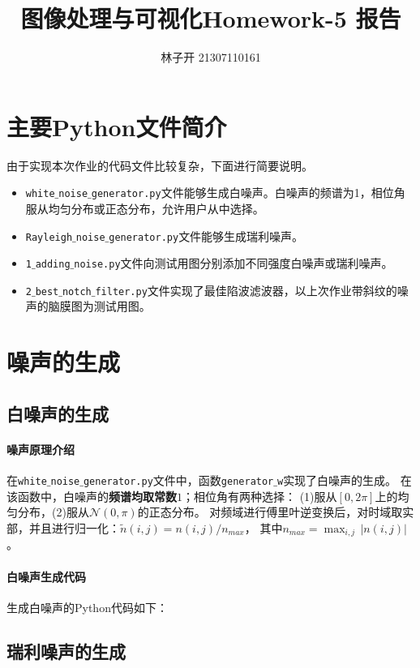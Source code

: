 \documentclass{article}
\title{图像处理与可视化Homework-5 报告}
\author{林子开 21307110161}
\begin{document}
	\maketitle
	\tableofcontents

\section{主要Python文件简介}
由于实现本次作业的代码文件比较复杂，下面进行简要说明。
\begin{itemize}
    \item \texttt{white$\_$noise$\_$generator.py}文件能够生成白噪声。白噪声的频谱为1，相位角服从均匀分布或正态分布，允许用户从中选择。
    \item  \texttt{Rayleigh$\_$noise$\_$generator.py}文件能够生成瑞利噪声。
    \item \texttt{1$\_$adding$\_$noise.py}文件向测试用图分别添加不同强度白噪声或瑞利噪声。
    \item \texttt{2$\_$best$\_$notch$\_$filter.py}文件实现了最佳陷波滤波器，以上次作业带斜纹的噪声的脑膜图为测试用图。
\end{itemize}

\section{噪声的生成}

\subsection{白噪声的生成}
\paragraph{噪声原理介绍}
在\texttt{white$\_$noise$\_$generator.py}文件中，函数\texttt{generator$\_$w}实现了白噪声的生成。
在该函数中，白噪声的\textbf{频谱均取常数$1$}；相位角有两种选择：
(1)服从$[0,2\pi]$上的均匀分布，(2)服从$\mathcal{N}(0,\pi)$的正态分布。
对频域进行傅里叶逆变换后，对时域取实部，并且进行归一化：$\tilde{n}(i,j) = n(i,j)/n_{max}$，
其中$n_{max} = \mathop{max}_{i,j}\,|n(i,j)|$。  

\paragraph{白噪声生成代码}
生成白噪声的Python代码如下：
 


\subsection{瑞利噪声的生成}
\end{document}
